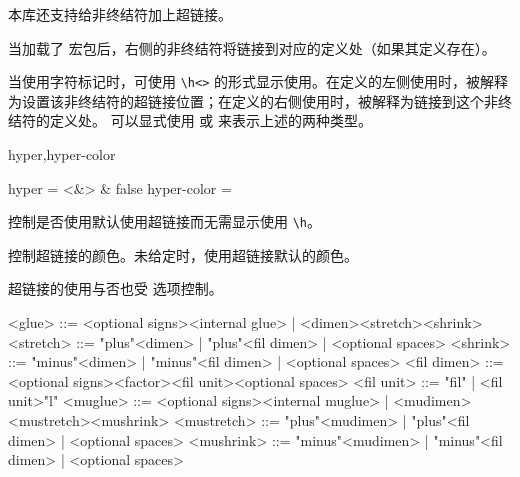 \documentclass[twoside]{book}
\def\xampletext{\par}
\begin{document}
本库还支持给非终结符加上超链接。

当加载了  宏包后，右侧的非终结符将链接到对应的定义处（如果其定义存在）。

当使用字符标记时，可使用 \verb|\h<|\verb|>| 的形式显示使用。在定义的左侧使用时，被解释为设置该非终结符的超链接位置；在定义的右侧使用时，被解释为链接到这个非终结符的定义处。
可以显式使用  或  来表示上述的两种类型。

\begin{keyval}[path=texbnf]{hyper,hyper-color}
  \begin{syntax}
    hyper = <&\TTF> & false 
    hyper-color = 
  \end{syntax}
 控制是否使用默认使用超链接而无需显示使用 \verb|\h|。

 控制超链接的颜色。未给定时，使用超链接默认的颜色。

 超链接的使用与否也受  选项控制。
\end{keyval}


\begin{xample}[language={[BNF]{TeX}}]
\begin{latexbnf}[hyper, hyper-color=purple]
<glue> ::= <optional signs><internal glue>
  | <dimen><stretch><shrink>
<stretch> ::= "plus"<dimen> | "plus"<fil dimen> | <optional spaces>
<shrink> ::= "minus"<dimen> | "minus"<fil dimen> | <optional spaces>
<fil dimen> ::= <optional signs><factor><fil unit><optional spaces>
<fil unit> ::= "fil" | <fil unit>"l"
<muglue> ::= <optional signs><internal muglue>
  | <mudimen><mustretch><mushrink>
<mustretch> ::= "plus"<mudimen> | "plus"<fil dimen> | <optional spaces>
<mushrink> ::= "minus"<mudimen> | "minus"<fil dimen> | <optional spaces>
\end{latexbnf}
\stopxamplecode
\xamplecode
\xampleline\par\nointerlineskip\par
\xampletext
\end{xample}

\enlargethispage{10pt}
\end{document}
